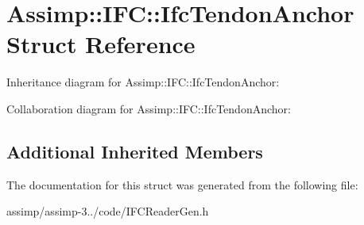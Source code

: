 \hypertarget{struct_assimp_1_1_i_f_c_1_1_ifc_tendon_anchor}{\section{Assimp\+:\+:I\+F\+C\+:\+:Ifc\+Tendon\+Anchor Struct Reference}
\label{struct_assimp_1_1_i_f_c_1_1_ifc_tendon_anchor}
}


Inheritance diagram for Assimp\+:\+:I\+F\+C\+:\+:Ifc\+Tendon\+Anchor\+:


Collaboration diagram for Assimp\+:\+:I\+F\+C\+:\+:Ifc\+Tendon\+Anchor\+:
\subsection*{Additional Inherited Members}


The documentation for this struct was generated from the following file\+:\begin{DoxyCompactItemize}
\item 
assimp/assimp-\/3../code/I\+F\+C\+Reader\+Gen.\+h\end{DoxyCompactItemize}
